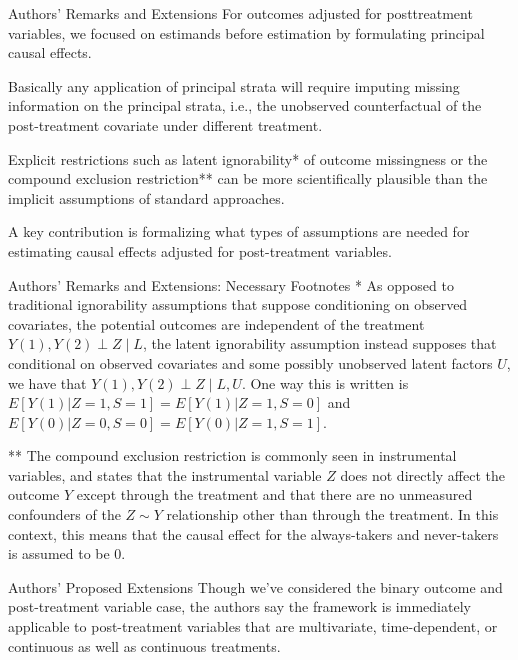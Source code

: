 \documentclass[10pt]{beamer}
\begin{document}
\begin{frame}{Authors' Remarks and Extensions}
For outcomes adjusted for posttreatment variables, we focused
on estimands before estimation by formulating principal causal effects. 

Basically any application of principal strata will require 
imputing missing information on the principal strata, i.e., 
the unobserved counterfactual of the post-treatment 
covariate under different treatment. 

Explicit restrictions such as latent ignorability* of outcome missingness or 
the compound exclusion restriction** can be 
more scientifically plausible than the implicit assumptions of 
standard approaches. 

A key contribution is formalizing what types of assumptions are needed for
estimating causal effects adjusted for post-treatment variables. 
\end{frame}

\begin{frame}{Authors' Remarks and Extensions: Necessary Footnotes}
\small
* As opposed to traditional ignorability assumptions 
that suppose conditioning on observed covariates, the potential outcomes
are independent of the treatment $Y(1), Y(2) \perp Z \mid L$, the 
latent ignorability assumption instead supposes that 
conditional on observed covariates and some possibly 
unobserved latent factors $U$, we have that $Y(1), Y(2) \perp Z \mid L, U$. 
\newline \newline 
One way this is written is $E[Y(1) | Z = 1, S = 1] = E[Y(1) | Z = 1, S = 0]$
and $E[Y(0) | Z = 0, S = 0] = E[Y(0) | Z = 1, S = 1]$. \newline

** The compound exclusion restriction 
is commonly seen in instrumental variables, and states that 
the instrumental variable $Z$ does not directly affect the outcome 
$Y$ except through the treatment and that there are no
unmeasured confounders of the $Z \sim Y$ relationship other than 
through the treatment. In this context, this means that 
the causal effect for the always-takers and never-takers is 
assumed to be 0. 
\normalsize
\end{frame}

\begin{frame}{Authors' Proposed Extensions}
Though we've considered the binary outcome and post-treatment variable case, the authors say 
the framework is immediately applicable to post-treatment variables that 
are multivariate, time-dependent, or continuous as well as continuous
treatments. 
\end{frame}
\end{document}
